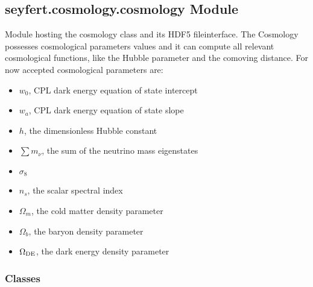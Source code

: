 \documentclass[letterpaper,10pt,english]{sphinxmanual}
\begin{document}
\subsection{seyfert.cosmology.cosmology Module}
\label{\detokenize{cosmology:module-seyfert.cosmology.cosmology}}\label{\detokenize{cosmology:seyfert-cosmology-cosmology-module}}
\sphinxAtStartPar
Module hosting the cosmology class and its HDF5 file\sphinxhyphen{}interface.
The Cosmology possesses cosmological parameters values and it can compute all relevant cosmological functions, like the
Hubble parameter and the co\sphinxhyphen{}moving distance. For now accepted cosmological parameters are:
\begin{itemize}
\item {} 
\sphinxAtStartPar
\(w_0\), CPL dark energy equation of state intercept

\item {} 
\sphinxAtStartPar
\(w_a\), CPL dark energy equation of state slope

\item {} 
\sphinxAtStartPar
\(h\), the dimensionless Hubble constant

\item {} 
\sphinxAtStartPar
\(\sum m_{\nu}\), the sum of the neutrino mass eigenstates

\item {} 
\sphinxAtStartPar
\(\sigma_8\)

\item {} 
\sphinxAtStartPar
\(n_s\), the scalar spectral index

\item {} 
\sphinxAtStartPar
\(\Omega_m\), the cold matter density parameter

\item {} 
\sphinxAtStartPar
\(\Omega_b\), the baryon density parameter

\item {} 
\sphinxAtStartPar
\(\Omega_{\rm DE}\), the dark energy density parameter

\end{itemize}


\subsubsection{Classes}
\label{\detokenize{cosmology:classes}}
\end{document}
